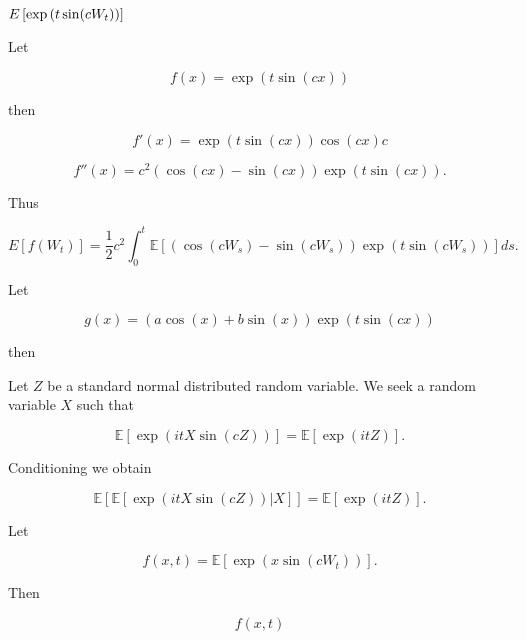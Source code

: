 \documentclass{letter}
\begin{document}
{\boldmath$\mathbf \mathbb{E}\left[\exp\left(t\sin(cW_t)\right)\right]$}

Let

$$f(x)=\exp\left(t\sin\left(cx\right)\right)$$

then

$$f'(x)=\exp\left(t\sin\left(cx\right)\right)\cos\left(cx\right)c$$

$$f''(x)=c^2\left(\cos\left(cx\right)-\sin\left(cx\right)\right)\exp\left(t\sin\left(cx\right)\right).$$

Thus

$$E[f\left(W_t\right)] = \frac{1}{2}c^2\int_0^t \mathbb{E}\left[\left(\cos(cW_s)-\sin(cW_s)\right)\exp\left(t\sin\left(cW_s\right)\right)\right]ds.$$


Let

$$g(x)=\left(a\cos(x)+b\sin(x)\right)\exp(t\sin\left(cx\right))$$

then


Let $Z$ be a standard normal distributed random variable. We seek a random variable $X$ such that

$$\mathbb{E}[\exp(itX\sin(cZ))]=\mathbb{E}[\exp(itZ)].$$

Conditioning we obtain

$$\mathbb{E}[\mathbb{E}[\exp(itX\sin(cZ))|X]]=\mathbb{E}[\exp(itZ)].$$

Let

$$f(x,t)=\mathbb{E}[\exp(x\sin(cW_t))].$$

Then

$$f(x,t)$$
\end{document}
